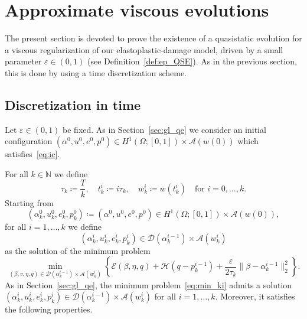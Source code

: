 \documentclass[reqno]{amsart}
\theoremstyle{definition}
\numberwithin{equation}{section}
\def\N {\mathbb N}
\begin{document}
\section{Approximate viscous evolutions}\label{sec:ap_ve}

The present section is devoted to prove the existence of a quasistatic evolution for a viscous regularization of our elastoplastic-damage model, driven by a small parameter $\varepsilon\in(0,1)$ (see Definition~\ref{def:ep_QSE}). As in the previous section, this is done by using a time discretization scheme. 

\subsection{Discretization in time}

Let $\varepsilon\in(0,1)$ be fixed. As in Section~\ref{sec:gl_qe} we consider an initial configuration $(\alpha^0,u^0,e^0,p^0)\in H^1(\Omega;[0,1])\times\mathcal A(w(0))$ which satisfies~\eqref{eq:ic}.

For all $k\in\N$ we define
\begin{equation*}
\tau_k\coloneqq \frac{T}{k},\quad t_k^i\coloneqq i\tau_k,\quad w_k^i\coloneqq w(t_k^i)\quad\text{for $i=0,\dots,k$}.
\end{equation*}
Starting from
\begin{equation*}
(\alpha_k^0,u_k^0,e_k^0,p_k^0)\coloneqq (\alpha^0,u^0,e^0,p^0)\in H^1(\Omega;[0,1])\times \mathcal A(w(0)),
\end{equation*}
for all $i=1,\dots,k$ we define
\begin{equation*}
(\alpha_k^i,u_k^i,e_k^i,p_k^i)\in \mathcal D(\alpha_k^{i-1})\times \mathcal A(w_k^i)
\end{equation*}
as the solution of the minimum problem
\begin{equation}\label{eq:min_ki}
\min_{(\beta,v,\eta,q)\in \mathcal D(\alpha_k^{i-1})\times \mathcal A(w_k^i)}\left\{\mathcal E(\beta,\eta,q)+\mathcal H(q-p_k^{i-1})+\frac{\varepsilon}{2\tau_k}\|\beta-\alpha_k^{i-1}\|_2^2\right\}.
\end{equation}
As in Section~\ref{sec:gl_qe}, the minimum problem~\eqref{eq:min_ki} admits a solution $(\alpha_k^i,u_k^i,e_k^i,p_k^i)\in\mathcal D(\alpha_k^{i-1})\times \mathcal A(w_k^i)$ for all $i=1,\dots,k$. Moreover, it satisfies the following properties.
\end{document}
